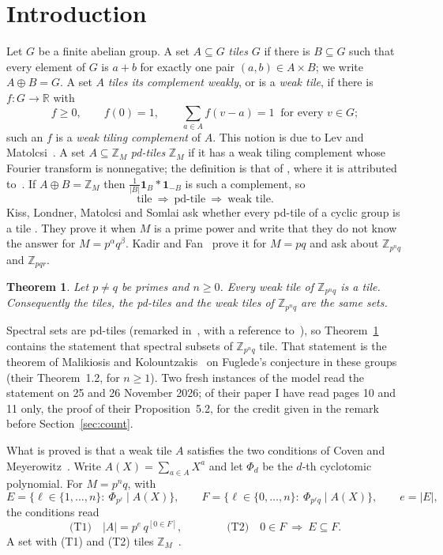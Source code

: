 \documentclass[11pt,a4paper]{amsart}
\newtheorem{theorem}{Theorem}
\theoremstyle{definition}
\theoremstyle{remark}
\newcommand{\Z}{\mathbb{Z}}
\newcommand{\R}{\mathbb{R}}
\newcommand{\one}{\mathbf{1}}
\begin{document}
\section{Introduction}

Let $G$ be a finite abelian group. A set $A\subseteq G$ \emph{tiles} $G$ if there is $B\subseteq G$ such that
every element of $G$ is $a+b$ for exactly one pair $(a,b)\in A\times B$; we write $A\oplus B=G$. A set $A$
\emph{tiles its complement weakly}, or is a \emph{weak tile}, if there is $f\colon G\to\R$ with
\[
 f\ge 0,\qquad f(0)=1,\qquad \sum_{a\in A} f(v-a)=1\ \text{ for every } v\in G ;
\]
such an $f$ is a \emph{weak tiling complement} of $A$. This notion is due to Lev and Matolcsi~\cite{LM}. A set
$A\subseteq\Z_M$ \emph{pd-tiles} $\Z_M$ if it has a weak tiling complement whose Fourier transform is
nonnegative; the definition is that of \cite[Definition~1.3]{KLMS}, where it is attributed to~\cite{KMMS}. If $A\oplus B=\Z_M$ then $\frac1{|B|}\one_B*\one_{-B}$ is such a complement, so
\[
 \text{tile}\ \Longrightarrow\ \text{pd-tile}\ \Longrightarrow\ \text{weak tile}.
\]
Kiss, Londner, Matolcsi and Somlai ask whether every pd-tile of a cyclic group is a tile \cite[Problem~1.1]{KLMS}.
They prove it when $M$ is a prime power and write that they do not know the answer for $M=p^\alpha q^\beta$.
Kadir and Fan~\cite{KF} prove it for $M=pq$ and ask about $\Z_{p^nq}$ and $\Z_{pqr}$.

\begin{theorem}\label{thm:main}
Let $p\ne q$ be primes and $n\ge 0$. Every weak tile of $\Z_{p^nq}$ is a tile. Consequently the tiles, the
pd-tiles and the weak tiles of $\Z_{p^nq}$ are the same sets.
\end{theorem}

Spectral sets are pd-tiles (remarked in~\cite{KLMS}, with a reference to~\cite{KMMS}), so
Theorem~\ref{thm:main} contains the statement that spectral subsets of $\Z_{p^nq}$ tile. That
statement is the theorem of Malikiosis and Kolountzakis~\cite{MK} on Fuglede's conjecture in these
groups (their Theorem~1.2, for $n\ge 1$). Two fresh instances of the model read
the statement on 25 and 26 November 2026; of their paper I have read pages 10 and 11 only, the proof of their
Proposition~5.2, for the credit given in the remark before Section~\ref{sec:count}.

What is proved is that a weak tile $A$ satisfies the two conditions of Coven and Meyerowitz~\cite{CM}. Write
$A(X)=\sum_{a\in A}X^a$ and let $\Phi_d$ be the $d$-th cyclotomic polynomial. For $M=p^nq$, with
\[
 E=\{\ell\in\{1,\dots,n\}:\ \Phi_{p^\ell}\mid A(X)\},\qquad
 F=\{\ell\in\{0,\dots,n\}:\ \Phi_{p^\ell q}\mid A(X)\},\qquad e=|E|,
\]
the conditions read
\[
 \text{(T1)}\quad |A|=p^{e}\,q^{[0\in F]},\qquad\qquad \text{(T2)}\quad 0\in F\ \Longrightarrow\ E\subseteq F .
\]
A set with (T1) and (T2) tiles $\Z_M$~\cite{CM}.
\end{document}
